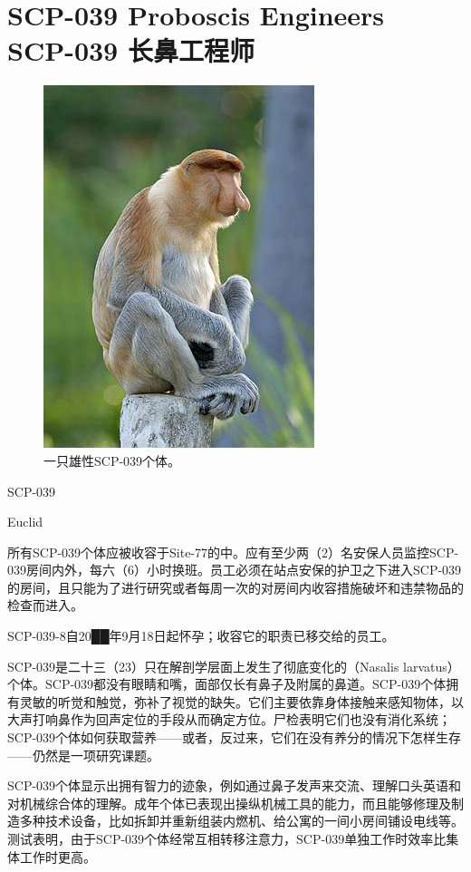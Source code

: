\chapter[SCP-039 长鼻工程师]{
    SCP-039 Proboscis Engineers\\
    SCP-039 长鼻工程师
}

\label{chap:SCP-039}

\begin{figure}[H]
    \centering
    \includegraphics[width=0.5\linewidth]{images/SCP-039.png}
    \caption*{一只雄性SCP-039个体。}
\end{figure}

SCP-039

Euclid

所有SCP-039个体应被收容于Site-77的中。应有至少两（2）名安保人员监控SCP-039房间内外，每六（6）小时换班。员工必须在站点安保的护卫之下进入SCP-039的房间，且只能为了进行研究或者每周一次的对房间内收容措施破坏和违禁物品的检查而进入。

SCP-039-8自20██年9月18日起怀孕；收容它的职责已移交给的员工。

SCP-039是二十三（23）只在解剖学层面上发生了彻底变化的（Nasalis larvatus）个体。SCP-039都没有眼睛和嘴，面部仅长有鼻子及附属的鼻道。SCP-039个体拥有灵敏的听觉和触觉，弥补了视觉的缺失。它们主要依靠身体接触来感知物体，以大声打响鼻作为回声定位的手段从而确定方位。尸检表明它们也没有消化系统；SCP-039个体如何获取营养——或者，反过来，它们在没有养分的情况下怎样生存——仍然是一项研究课题。

SCP-039个体显示出拥有智力的迹象，例如通过鼻子发声来交流、理解口头英语和对机械综合体的理解。成年个体已表现出操纵机械工具的能力，而且能够修理及制造多种技术设备，比如拆卸并重新组装内燃机、给公寓的一间小房间铺设电线等。测试表明，由于SCP-039个体经常互相转移注意力，SCP-039单独工作时效率比集体工作时更高。

